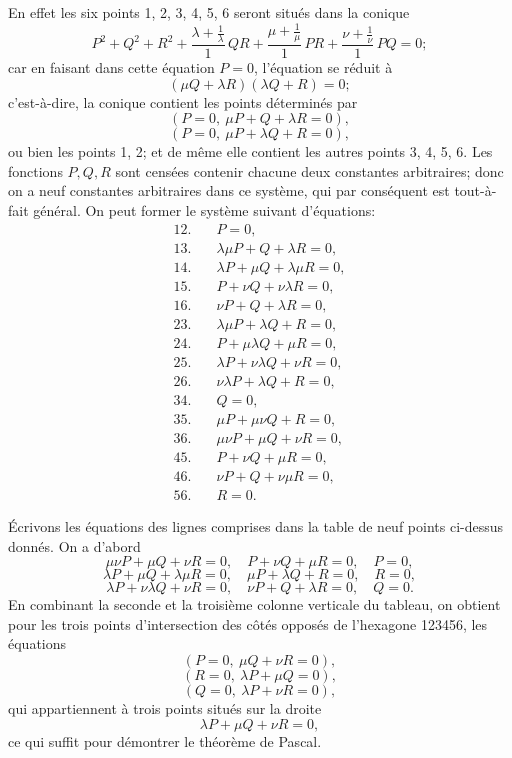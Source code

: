 \documentclass[12pt,a4paper]{article}
\begin{document}
En effet les six points 1, 2, 3, 4, 5, 6 seront situ\'es dans la conique
\[
P^2 + Q^2 + R^2 + \frac{\lambda + \tfrac{1}{\lambda}}{1}\,QR + \frac{\mu + \tfrac{1}{\mu}}{1}\,PR + \frac{\nu + \tfrac{1}{\nu}}{1}\,PQ = 0;
\]
car en faisant dans cette \'equation $P = 0$, l'\'equation se r\'eduit \`a
\[
(\mu Q + \lambda R)(\lambda Q + R) = 0;
\]
c'est-\`a-dire, la conique contient les points d\'etermin\'es par
\[
(P = 0,\ \mu P + Q + \lambda R = 0),
\]
\[
(P = 0,\ \mu P + \lambda Q + R = 0),
\]
ou bien les points 1, 2; et de m\^eme elle contient les autres points 3, 4, 5, 6. Les fonctions $P, Q, R$ sont cens\'ees contenir chacune deux constantes arbitraires; donc on a neuf constantes arbitraires dans ce syst\`eme, qui par cons\'equent est tout-\`a-fait g\'en\'eral. On peut former le syst\`eme suivant d'\'equations:
\begin{align*}
12.\quad & P = 0,\\
13.\quad & \lambda\mu P + Q + \lambda R = 0,\\
14.\quad & \lambda P + \mu Q + \lambda\mu R = 0,\\
15.\quad & P + \nu Q + \nu\lambda R = 0,\\
16.\quad & \nu P + Q + \lambda R = 0,\\
23.\quad & \lambda\mu P + \lambda Q + R = 0,\\
24.\quad & P + \mu\lambda Q + \mu R = 0,\\
25.\quad & \lambda P + \nu\lambda Q + \nu R = 0,\\
26.\quad & \nu\lambda P + \lambda Q + R = 0,\\
34.\quad & Q = 0,\\
35.\quad & \mu P + \mu\nu Q + R = 0,\\
36.\quad & \mu\nu P + \mu Q + \nu R = 0,\\
45.\quad & P + \nu Q + \mu R = 0,\\
46.\quad & \nu P + Q + \nu\mu R = 0,\\
56.\quad & R = 0.
\end{align*}

\'Ecrivons les \'equations des lignes comprises dans la table de neuf points ci-dessus donn\'es. On a d'abord
\[
\mu\nu P + \mu Q + \nu R = 0,\quad P + \nu Q + \mu R = 0,\quad P = 0,
\]
\[
\lambda P + \mu Q + \lambda\mu R = 0,\quad \mu P + \lambda Q + R = 0,\quad R = 0,
\]
\[
\lambda P + \nu\lambda Q + \nu R = 0,\quad \nu P + Q + \lambda R = 0,\quad Q = 0.
\]
En combinant la seconde et la troisi\`eme colonne verticale du tableau, on obtient pour les trois points d'intersection des c\^ot\'es oppos\'es de l'hexagone 123456, les \'equations
\[
(P = 0,\ \mu Q + \nu R = 0),
\]
\[
(R = 0,\ \lambda P + \mu Q = 0),
\]
\[
(Q = 0,\ \lambda P + \nu R = 0),
\]
qui appartiennent \`a trois points situ\'es sur la droite
\[
\lambda P + \mu Q + \nu R = 0,
\]
ce qui suffit pour d\'emontrer le th\'eor\`eme de Pascal.
\end{document}
